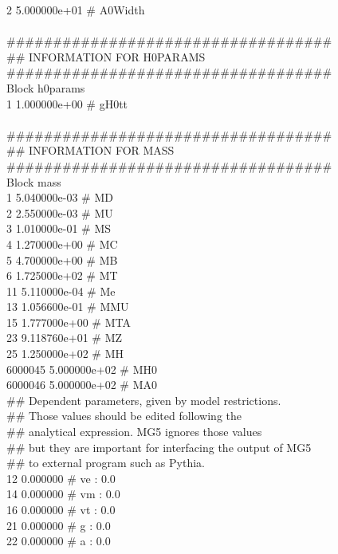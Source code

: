 {    2 5.000000e+01 \# A0Width \\
\\
\#\#\#\#\#\#\#\#\#\#\#\#\#\#\#\#\#\#\#\#\#\#\#\#\#\#\#\#\#\#\#\#\#\#\#\\
\#\# INFORMATION FOR H0PARAMS\\
\#\#\#\#\#\#\#\#\#\#\#\#\#\#\#\#\#\#\#\#\#\#\#\#\#\#\#\#\#\#\#\#\#\#\#\\
Block h0params \\
    1 1.000000e+00 \# gH0tt\\ 
\\
\#\#\#\#\#\#\#\#\#\#\#\#\#\#\#\#\#\#\#\#\#\#\#\#\#\#\#\#\#\#\#\#\#\#\#\\
\#\# INFORMATION FOR MASS\\
\#\#\#\#\#\#\#\#\#\#\#\#\#\#\#\#\#\#\#\#\#\#\#\#\#\#\#\#\#\#\#\#\#\#\#\\
Block mass \\
    1 5.040000e-03 \# MD \\
    2 2.550000e-03 \# MU \\
    3 1.010000e-01 \# MS \\
    4 1.270000e+00 \# MC \\
    5 4.700000e+00 \# MB \\
    6 1.725000e+02 \# MT \\
   11 5.110000e-04 \# Me \\
   13 1.056600e-01 \# MMU \\
   15 1.777000e+00 \# MTA \\
   23 9.118760e+01 \# MZ \\
   25 1.250000e+02 \# MH \\
  6000045 5.000000e+02 \# MH0\\ 
  6000046 5.000000e+02 \# MA0 \\
\#\# Dependent parameters, given by model restrictions.\\
\#\# Those values should be edited following the \\
\#\# analytical expression. MG5 ignores those values\\ 
\#\# but they are important for interfacing the output of MG5\\
\#\# to external program such as Pythia.\\
  12 0.000000 \# ve : 0.0 \\
  14 0.000000 \# vm : 0.0 \\
  16 0.000000 \# vt : 0.0 \\
  21 0.000000 \# g : 0.0 \\
  22 0.000000 \# a : 0.0 \\
}
